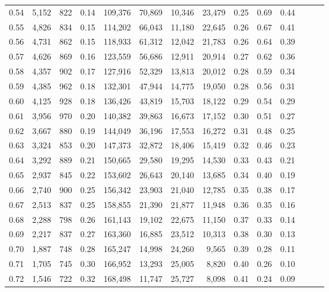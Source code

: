 \begin{tabular}{rrrrrrrrrrrrrr}
0.54 &  5,152 &  822 &  0.14 &  109,376 &   70,869 &  10,346 &  23,479 &  0.25 &  0.69 &      0.44 \\
0.55 &  4,826 &  834 &  0.15 &  114,202 &   66,043 &  11,180 &  22,645 &  0.26 &  0.67 &      0.41 \\
0.56 &  4,731 &  862 &  0.15 &  118,933 &   61,312 &  12,042 &  21,783 &  0.26 &  0.64 &      0.39 \\
0.57 &  4,626 &  869 &  0.16 &  123,559 &   56,686 &  12,911 &  20,914 &  0.27 &  0.62 &      0.36 \\
0.58 &  4,357 &  902 &  0.17 &  127,916 &   52,329 &  13,813 &  20,012 &  0.28 &  0.59 &      0.34 \\
0.59 &  4,385 &  962 &  0.18 &  132,301 &   47,944 &  14,775 &  19,050 &  0.28 &  0.56 &      0.31 \\
0.60 &  4,125 &  928 &  0.18 &  136,426 &   43,819 &  15,703 &  18,122 &  0.29 &  0.54 &      0.29 \\
0.61 &  3,956 &  970 &  0.20 &  140,382 &   39,863 &  16,673 &  17,152 &  0.30 &  0.51 &      0.27 \\
0.62 &  3,667 &  880 &  0.19 &  144,049 &   36,196 &  17,553 &  16,272 &  0.31 &  0.48 &      0.25 \\
0.63 &  3,324 &  853 &  0.20 &  147,373 &   32,872 &  18,406 &  15,419 &  0.32 &  0.46 &      0.23 \\
0.64 &  3,292 &  889 &  0.21 &  150,665 &   29,580 &  19,295 &  14,530 &  0.33 &  0.43 &      0.21 \\
0.65 &  2,937 &  845 &  0.22 &  153,602 &   26,643 &  20,140 &  13,685 &  0.34 &  0.40 &      0.19 \\
0.66 &  2,740 &  900 &  0.25 &  156,342 &   23,903 &  21,040 &  12,785 &  0.35 &  0.38 &      0.17 \\
0.67 &  2,513 &  837 &  0.25 &  158,855 &   21,390 &  21,877 &  11,948 &  0.36 &  0.35 &      0.16 \\
0.68 &  2,288 &  798 &  0.26 &  161,143 &   19,102 &  22,675 &  11,150 &  0.37 &  0.33 &      0.14 \\
0.69 &  2,217 &  837 &  0.27 &  163,360 &   16,885 &  23,512 &  10,313 &  0.38 &  0.30 &      0.13 \\
0.70 &  1,887 &  748 &  0.28 &  165,247 &   14,998 &  24,260 &   9,565 &  0.39 &  0.28 &      0.11 \\
0.71 &  1,705 &  745 &  0.30 &  166,952 &   13,293 &  25,005 &   8,820 &  0.40 &  0.26 &      0.10 \\
0.72 &  1,546 &  722 &  0.32 &  168,498 &   11,747 &  25,727 &   8,098 &  0.41 &  0.24 &      0.09 \\

\end{tabular}
